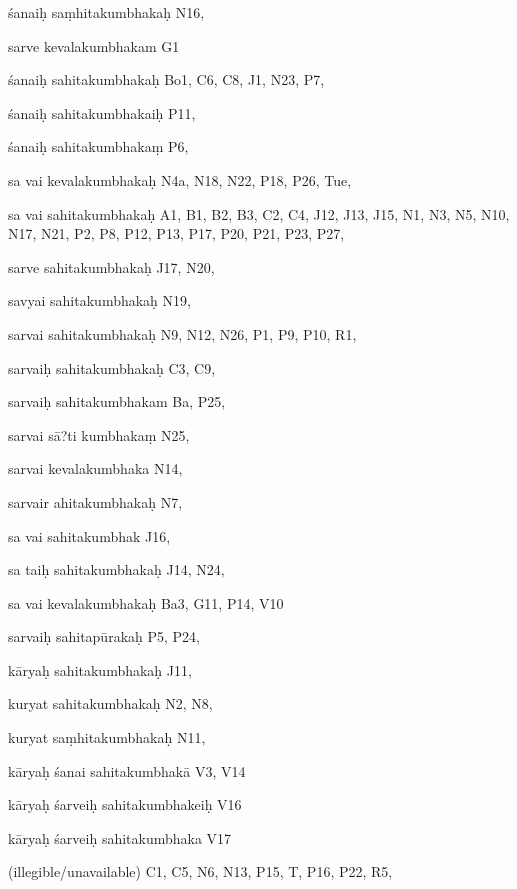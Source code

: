 \begin{marma}[hp02_009]
\begin{marma}[hp02_011]
\begin{marma}[hp02_73b]
\item[śanaiḥ saṃhitakumbhakaḥ] N16, 
\item[sarve kevalakumbhakam] G1
\item[śanaiḥ sahitakumbhakaḥ] Bo1, C6, C8, J1, N23, P7, 
\item[śanaiḥ sahitakumbhakaiḥ] P11,
\item[śanaiḥ sahitakumbhakaṃ] P6, 
\item[sa vai kevalakumbhakaḥ] N4a, N18, N22, P18, P26, Tue, 
\item[sa vai sahitakumbhakaḥ] A1, B1, B2, B3, C2, C4, J12, J13, J15, N1, N3, N5, N10, N17, N21, P2, P8, P12, P13, P17, P20, P21, P23, P27, 
\item[sarve sahitakumbhakaḥ] J17, N20, 
\item[savyai sahitakumbhakaḥ] N19, 
\item[sarvai sahitakumbhakaḥ] N9, N12, N26, P1, P9, P10, R1, 
\item[sarvaiḥ sahitakumbhakaḥ] C3, C9, 
\item[sarvaiḥ sahitakumbhakam] Ba, P25,
\item[sarvai sā?ti kumbhakaṃ] N25,
\item[sarvai kevalakumbhaka] N14,
\item[sarvair ahitakumbhakaḥ] N7, 
\item[sa vai sahitakumbhak] J16, 
\item[sa taiḥ sahitakumbhakaḥ] J14, N24, 
\item[sa vai kevalakumbhakaḥ] Ba3, G11, P14, V10
\item[sarvaiḥ sahitapūrakaḥ] P5, P24, 
\item[kāryaḥ sahitakumbhakaḥ] J11,
\item[kuryat sahitakumbhakaḥ] N2, N8, 
\item[kuryat saṃhitakumbhakaḥ] N11, 
\item[kāryaḥ śanai sahitakumbhakā] V3, V14
\item[kāryaḥ śarveiḥ sahitakumbhakeiḥ] V16
\item[kāryaḥ śarveiḥ sahitakumbhaka] V17
\item[(illegible/unavailable)] C1, C5, N6, N13, P15, T, P16, P22, R5,
  \begin{description}

    \end{description}
 \end{marma}


\end{marma}
\end{marma}
